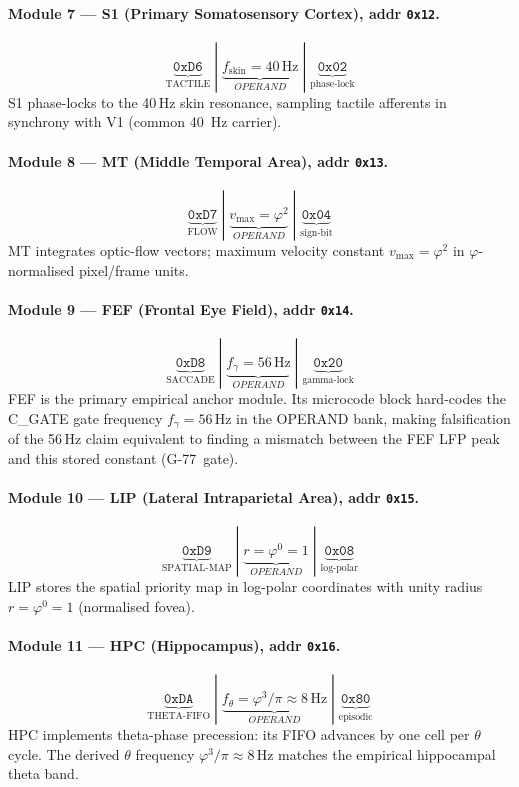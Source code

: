\paragraph{Module 7 — S1 (Primary Somatosensory Cortex), addr \texttt{0x12}.}
\[
  \underbrace{\mathtt{0xD6}}_{\text{TACTILE}}
  \;|\;
  \underbrace{f_{\text{skin}} = 40\,\text{Hz}}_{OPERAND}
  \;|\;
  \underbrace{\mathtt{0x02}}_{\text{phase-lock}}
\]
S1 phase-locks to the 40\,Hz skin resonance, sampling tactile
afferents in synchrony with V1 (common 40~Hz carrier).

\paragraph{Module 8 — MT (Middle Temporal Area), addr \texttt{0x13}.}
\[
  \underbrace{\mathtt{0xD7}}_{\text{FLOW}}
  \;|\;
  \underbrace{v_{\max} = \varphi^{2}}_{OPERAND}
  \;|\;
  \underbrace{\mathtt{0x04}}_{\text{sign-bit}}
\]
MT integrates optic-flow vectors; maximum velocity constant
$v_{\max} = \varphi^{2}$ in $\varphi$-normalised pixel/frame units.

\paragraph{Module 9 — FEF (Frontal Eye Field), addr \texttt{0x14}.}
\[
  \underbrace{\mathtt{0xD8}}_{\text{SACCADE}}
  \;|\;
  \underbrace{f_{\gamma} = 56\,\text{Hz}}_{OPERAND}
  \;|\;
  \underbrace{\mathtt{0x20}}_{\text{gamma-lock}}
\]
FEF is the primary empirical anchor module.
Its microcode block hard-codes the C\_GATE gate frequency
$f_{\gamma} = 56\,\mathrm{Hz}$ in the OPERAND bank, making
falsification of the 56\,Hz claim equivalent to finding a mismatch
between the FEF LFP peak and this stored constant (G-77~gate).

\paragraph{Module 10 — LIP (Lateral Intraparietal Area), addr \texttt{0x15}.}
\[
  \underbrace{\mathtt{0xD9}}_{\text{SPATIAL-MAP}}
  \;|\;
  \underbrace{r = \varphi^{0}=1}_{OPERAND}
  \;|\;
  \underbrace{\mathtt{0x08}}_{\text{log-polar}}
\]
LIP stores the spatial priority map in log-polar coordinates with
unity radius $r = \varphi^{0} = 1$ (normalised fovea).

\paragraph{Module 11 — HPC (Hippocampus), addr \texttt{0x16}.}
\[
  \underbrace{\mathtt{0xDA}}_{\text{THETA-FIFO}}
  \;|\;
  \underbrace{f_{\theta} = \varphi^{3}/\pi \approx 8\,\text{Hz}}_{OPERAND}
  \;|\;
  \underbrace{\mathtt{0x80}}_{\text{episodic}}
\]
HPC implements theta-phase precession: its FIFO advances by one
cell per $\theta$ cycle.
The derived $\theta$ frequency $\varphi^{3}/\pi \approx 8\,\mathrm{Hz}$
matches the empirical hippocampal theta band.

